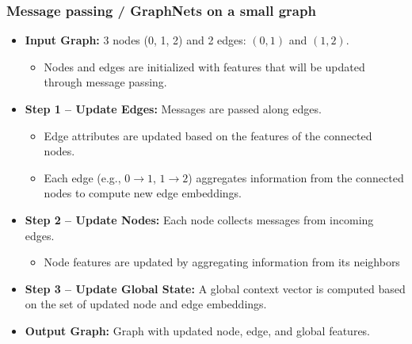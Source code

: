 \subsubsection{Message passing / GraphNets on a small graph}
\begin{example}
    \begin{itemize}
        \item \textbf{Input Graph:} 3 nodes (0, 1, 2) and 2 edges: $(0,1)$ and $(1,2)$.
        \begin{itemize}
            \item Nodes and edges are initialized with features that will be updated through message passing.
        \end{itemize}
    
        \item \textbf{Step 1 – Update Edges:} Messages are passed along edges.
        \begin{itemize}
            \item Edge attributes are updated based on the features of the connected nodes.
            \item Each edge (e.g., $0 \rightarrow 1$, $1 \rightarrow 2$) aggregates information from the connected nodes to compute new edge embeddings.
        \end{itemize}
    
        \item \textbf{Step 2 – Update Nodes:} Each node collects messages from incoming edges.
        \begin{itemize}
            \item Node features are updated by aggregating information from its neighbors
        \end{itemize}
    
        \item \textbf{Step 3 – Update Global State:} A global context vector is computed based on the set of updated node and edge embeddings.
    
        \item \textbf{Output Graph:} Graph with updated node, edge, and global features.
    \end{itemize}    
\end{example}
